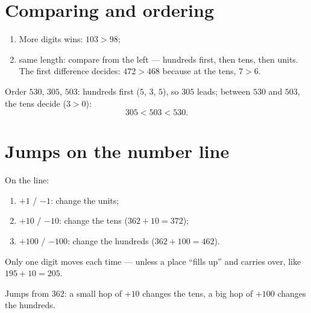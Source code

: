 \section{Comparing and ordering}

\begin{method}\label{met:g2:numbers:compare}
\begin{enumerate}
  \item More digits wins: $103 > 98$;
  \item same length: compare from the left --- hundreds first, then
        tens, then units. The first difference decides:
        $472 > 468$ because at the tens, $7 > 6$.
\end{enumerate}
\end{method}

\begin{example}\label{ex:g2:numbers:order}
Order $530$, $305$, $503$: hundreds first ($5$, $3$, $5$), so
$305$ leads; between $530$ and $503$, the tens decide ($3 > 0$):
\[
305 < 503 < 530 .
\]
\end{example}

\section{Jumps on the number line}

\begin{method}\label{met:g2:numbers:jumps}
On the line:
\begin{enumerate}
  \item $+1$ / $-1$: change the units;
  \item $+10$ / $-10$: change the tens ($362 + 10 = 372$);
  \item $+100$ / $-100$: change the hundreds ($362 + 100 = 462$).
\end{enumerate}
Only one digit moves each time --- unless a place ``fills up'' and
carries over, like $195 + 10 = 205$.
\end{method}

\begin{omfigure}

{\small Jumps from $362$: a small hop of $+10$ changes the tens, a
big hop of $+100$ changes the hundreds.}
\end{omfigure}

